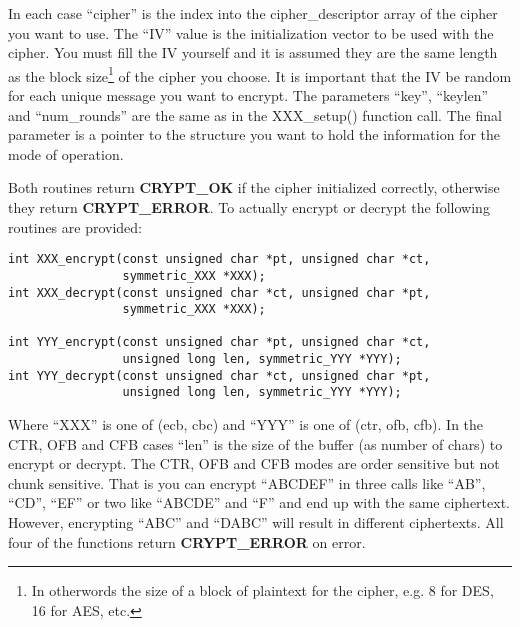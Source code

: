 \documentclass{book}
\begin{document}
In each case ``cipher'' is the index into the cipher\_descriptor array of the cipher you want to use.  The ``IV'' value is 
the initialization vector to be used with the cipher.  You must fill the IV yourself and it is assumed they are the same 
length as the block size\footnote{In otherwords the size of a block of plaintext for the cipher, e.g. 8 for DES, 16 for AES, etc.} 
of the cipher you choose.  It is important that the IV  be random for each unique message you want to encrypt.  The 
parameters ``key'', ``keylen'' and ``num\_rounds'' are the same as in the XXX\_setup() function call.  The final parameter 
is a pointer to the structure you want to hold the information for the mode of operation.

Both routines return {\bf CRYPT\_OK} if the cipher initialized correctly, otherwise they return {\bf CRYPT\_ERROR}.  To 
actually encrypt or decrypt the following routines are provided:
\begin{verbatim}
int XXX_encrypt(const unsigned char *pt, unsigned char *ct, 
                symmetric_XXX *XXX);
int XXX_decrypt(const unsigned char *ct, unsigned char *pt,
                symmetric_XXX *XXX);

int YYY_encrypt(const unsigned char *pt, unsigned char *ct, 
                unsigned long len, symmetric_YYY *YYY);
int YYY_decrypt(const unsigned char *ct, unsigned char *pt, 
                unsigned long len, symmetric_YYY *YYY);
\end{verbatim}
Where ``XXX'' is one of (ecb, cbc) and ``YYY'' is one of (ctr, ofb, cfb).  In the CTR, OFB and CFB cases ``len'' is the
size of the buffer (as number of chars) to encrypt or decrypt.  The CTR, OFB and CFB modes are order sensitive but not
chunk sensitive.  That is you can encrypt ``ABCDEF'' in three calls like ``AB'', ``CD'', ``EF'' or two like ``ABCDE'' and ``F''
and end up with the same ciphertext.  However, encrypting ``ABC'' and ``DABC'' will result in different ciphertexts.  All
four of the functions return {\bf CRYPT\_ERROR} on error.
\end{document}
